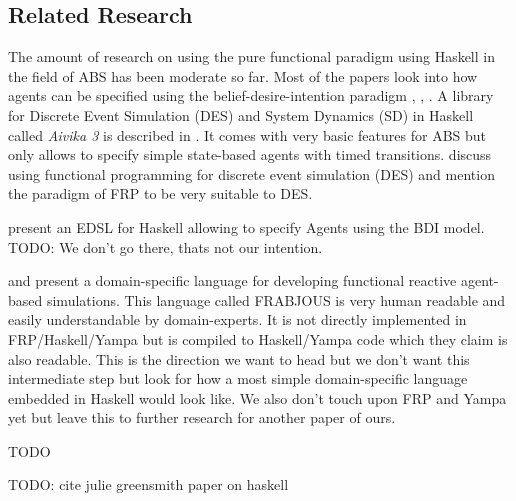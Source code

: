 \subsection{Related Research}
The amount of research on using the pure functional paradigm using Haskell in the field of ABS has been moderate so far.
Most of the papers look into how agents can be specified using the belief-desire-intention paradigm \cite{de_jong_suitability_2014}, \cite{sulzmann_specifying_2007}, \cite{jankovic_functional_2007}.
A library for Discrete Event Simulation (DES) and System Dynamics (SD) in Haskell called \textit{Aivika 3} is described in \cite{sorokin_aivika_2015}. It comes with very basic features for ABS but only allows to specify simple state-based agents with timed transitions.
\cite{jankovic_functional_2007} discuss using functional programming for discrete event simulation (DES) and mention the paradigm of FRP to be very suitable to DES.

\cite{sulzmann_specifying_2007} present an EDSL for Haskell allowing to specify Agents using the BDI model. TODO: We don't go there, thats not our intention. 

\cite{schneider_towards_2012} and \cite{vendrov_frabjous:_2014} present a domain-specific language for developing functional reactive agent-based simulations. This language called FRABJOUS is very human readable and easily understandable by domain-experts. It is not directly implemented in FRP/Haskell/Yampa but is compiled to Haskell/Yampa code which they claim is also readable. This is the direction we want to head but we don't want this intermediate step but look for how a most simple domain-specific language embedded in Haskell would look like. We also don't touch upon FRP and Yampa yet but leave this to further research for another paper of ours.

\cite{klugl_amason:_2013} TODO

TODO: cite julie greensmith paper on haskell
